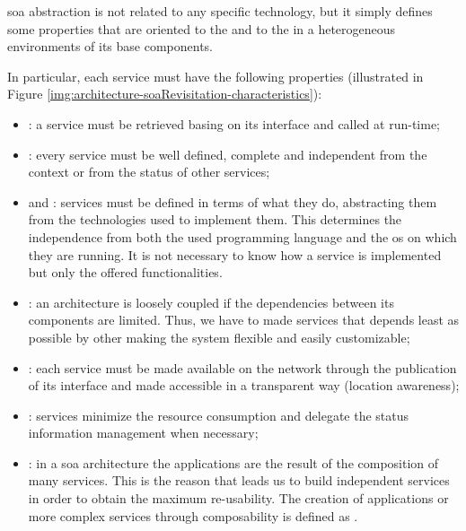 \ac{soa} abstraction is not related to any specific technology, but it simply defines some properties 
that are oriented to the  and to the  in a heterogeneous environments
of its base components.

In particular, each service must have the following properties (illustrated in Figure 
\ref{img:architecture-soaRevisitation-characteristics}):

\begin{itemize}
	\item{: a service must be retrieved basing on its interface and
		called at run-time;}
	\item{: every service must be well defined, complete and independent
		from the context or from the status of other services;}
	\item{ and : services must
		be defined in terms of what they do, abstracting them from the technologies used to implement
		them. This determines the independence from both the used programming language and the \acs{os}
		on which they are running. It is not necessary to know how a service is implemented but only
		the offered functionalities.}
	\item{: an architecture is loosely coupled if the dependencies
		between its components are limited. Thus, we have to made services that depends least as possible
		by other making the system flexible and easily customizable;}
	\item{: each service must be made available on the network through
		the publication of its interface and made accessible in a transparent way (location awareness);}
	\item{: services minimize the resource consumption and delegate
		the status information management when necessary;}
	\item{: in a \ac{soa} architecture the applications are the result of
		the composition of many services. This is the reason that leads us to build independent services
		in order to obtain the maximum re-usability. The creation of applications or more complex
		services through composability is defined as .}
\end{itemize}

